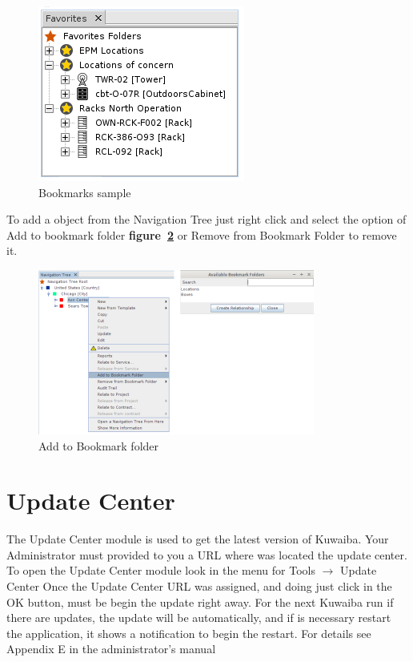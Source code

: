 \documentclass[a4paper]{article}
\begin{document}
			\begin{figure}[h!]
				\centering
				\includegraphics[width=0.5\linewidth]{img/bookmarks.png}
				\caption{Bookmarks sample}
				\label{fig:bookmakrs}
			\end{figure}
			
			To add a object from the Navigation Tree just right click and select the option of Add to bookmark folder \textbf{figure~\ref{fig:add_to_bookmark_folder}} or Remove from Bookmark Folder to remove it.
						
			\begin{figure}[h!]
				\centering
				\includegraphics[width=0.8\linewidth]{img/bm_add_to_bookmark_folder.png}
				\caption{Add to Bookmark folder}
				\label{fig:add_to_bookmark_folder}
			\end{figure}
							
		\newpage
		\section{Update Center}\label{sec:update_center}
		The Update Center module is used to get the latest version of Kuwaiba. Your Administrator must provided to you a URL where was located the update center. To open the Update Center module look in the menu for Tools $\rightarrow$ Update Center
		\newline
		Once the Update Center URL was assigned, and doing just click in the OK button, must be begin the update right away. For the next Kuwaiba run if  there are updates, the update will be automatically, and if is necessary restart the application, it shows a notification to begin the restart.
		\newline
		For details see Appendix E in the administrator's manual
		
\end{document}
